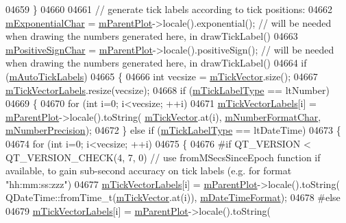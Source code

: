 \begin{DoxyCode}
04659   \}
04660 
04661   \textcolor{comment}{// generate tick labels according to tick positions:}
04662   \hyperlink{a00025_a0ec9dbb79704be01f780d34c6f57a08e}{mExponentialChar} = \hyperlink{a00044_aa2a528433e44db02b8aef23c1f9f90ed}{mParentPlot}->locale().exponential();   \textcolor{comment}{// will be needed
       when drawing the numbers generated here, in drawTickLabel()}
04663   \hyperlink{a00025_ae99d47103ec8ba66959205b23991241b}{mPositiveSignChar} = \hyperlink{a00044_aa2a528433e44db02b8aef23c1f9f90ed}{mParentPlot}->locale().positiveSign(); \textcolor{comment}{// will be needed
       when drawing the numbers generated here, in drawTickLabel()}
04664   \textcolor{keywordflow}{if} (\hyperlink{a00025_a721e496b342f272078c5ff84564e472f}{mAutoTickLabels})
04665   \{
04666     \textcolor{keywordtype}{int} vecsize = \hyperlink{a00025_aae0f9b9973b85be601200f00f5825087}{mTickVector}.size();
04667     \hyperlink{a00025_aeee4bd0fca3f587eafe33843d1cb4f82}{mTickVectorLabels}.resize(vecsize);
04668     \textcolor{keywordflow}{if} (\hyperlink{a00025_a6e056c1cb1aab0eddebfebbcb78c8f90}{mTickLabelType} == ltNumber)
04669     \{
04670       \textcolor{keywordflow}{for} (\textcolor{keywordtype}{int} i=0; i<vecsize; ++i)
04671         \hyperlink{a00025_aeee4bd0fca3f587eafe33843d1cb4f82}{mTickVectorLabels}[i] = \hyperlink{a00044_aa2a528433e44db02b8aef23c1f9f90ed}{mParentPlot}->locale().toString(
      \hyperlink{a00025_aae0f9b9973b85be601200f00f5825087}{mTickVector}.at(i), \hyperlink{a00025_a600d56365316ea783927f7d595f1ed54}{mNumberFormatChar}, 
      \hyperlink{a00025_acd76e8c783384d99ccc4a13797eec188}{mNumberPrecision});
04672     \} \textcolor{keywordflow}{else} \textcolor{keywordflow}{if} (\hyperlink{a00025_a6e056c1cb1aab0eddebfebbcb78c8f90}{mTickLabelType} == ltDateTime)
04673     \{
04674       \textcolor{keywordflow}{for} (\textcolor{keywordtype}{int} i=0; i<vecsize; ++i)
04675       \{
04676 \textcolor{preprocessor}{#if QT\_VERSION < QT\_VERSION\_CHECK(4, 7, 0) // use fromMSecsSinceEpoch function if available, to gain
       sub-second accuracy on tick labels (e.g. for format "hh:mm:ss:zzz")}
04677         \hyperlink{a00025_aeee4bd0fca3f587eafe33843d1cb4f82}{mTickVectorLabels}[i] = \hyperlink{a00044_aa2a528433e44db02b8aef23c1f9f90ed}{mParentPlot}->locale().toString(
      QDateTime::fromTime\_t(\hyperlink{a00025_aae0f9b9973b85be601200f00f5825087}{mTickVector}.at(i)), \hyperlink{a00025_a0b7ad83550d71daab4cfee2918e168e0}{mDateTimeFormat});
04678 \textcolor{preprocessor}{#else}
04679         \hyperlink{a00025_aeee4bd0fca3f587eafe33843d1cb4f82}{mTickVectorLabels}[i] = \hyperlink{a00044_aa2a528433e44db02b8aef23c1f9f90ed}{mParentPlot}->locale().toString(

\end{DoxyCode}
